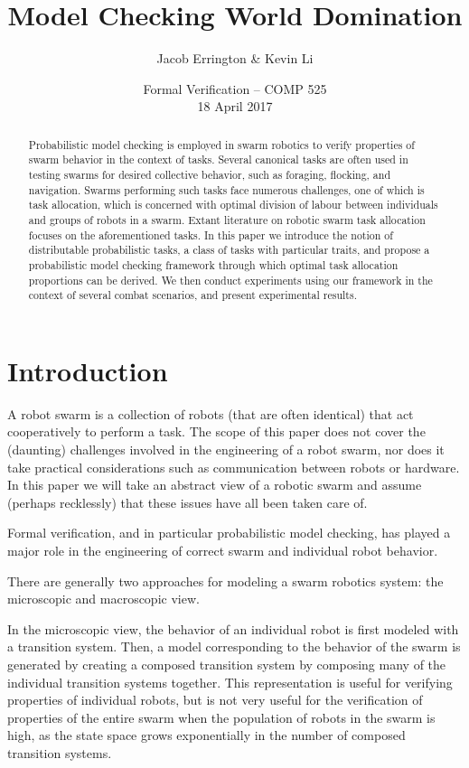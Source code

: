 \documentclass[11pt]{article}
\title{Model Checking World Domination}
\author{Jacob Errington \& Kevin Li}
\date{Formal Verification -- COMP 525\\18 April 2017}
\theoremstyle{definition}
\begin{document}
\maketitle

\begin{abstract}
    Probabilistic model checking is employed
    in swarm robotics to verify
    properties of swarm behavior in the context of
    tasks. Several canonical tasks are often used
    in testing swarms for desired collective behavior,
    such as foraging, flocking, and navigation.
    Swarms performing such tasks face numerous challenges,
    one of which is task allocation, which is concerned
    with optimal division of labour between individuals
    and groups of robots in a swarm.  Extant literature
    on robotic swarm task allocation focuses on the
    aforementioned tasks. In this paper we introduce the
    notion of distributable probabilistic tasks,
    a class of tasks with particular traits, and
    propose a probabilistic model checking framework
    through which optimal task allocation proportions
    can be derived. We then conduct experiments using our
    framework in the context of several combat scenarios,
    and present experimental results.
\end{abstract}

\section{Introduction}\label{sec:intro}

A robot swarm is a collection of robots (that are often
identical) that act cooperatively to perform a task.
The scope of this paper does not cover the (daunting) challenges
involved in the engineering of a robot swarm, nor does
it take practical considerations such as communication between
robots or hardware. In this paper we will take an abstract view
of a robotic swarm and assume (perhaps recklessly) that
these issues have all been taken care of.

Formal verification, and in particular probabilistic model
checking, has played a major role in the engineering of
correct swarm and individual robot behavior. %

There are generally two approaches for modeling a swarm robotics
system: the microscopic and macroscopic view.

In the microscopic view, the behavior of an individual robot
is first modeled with a transition system. Then,
a model corresponding to the behavior of the swarm is
generated by creating a composed transition system
by composing many of the individual transition systems
together. This representation is useful for verifying
properties of individual robots, but is not
very useful for the verification of properties of the
entire swarm when the population of robots in the swarm
is high, as the state space grows exponentially in
the number of composed transition systems.
\end{document}
